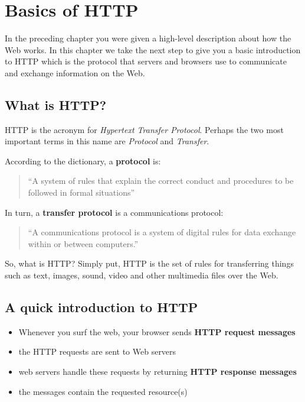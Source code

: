 \documentclass[
]{book}
\begin{document}
\hypertarget{http}{%
\chapter{Basics of HTTP}\label{http}}

In the preceding chapter you were given a high-level description about how the
Web works. In this chapter we take the next step to give you a basic introduction
to HTTP which is the protocol that servers and browsers use to communicate and
exchange information on the Web.

\hypertarget{what-is-http}{%
\section{What is HTTP?}\label{what-is-http}}

HTTP is the acronym for \emph{Hypertext Transfer Protocol}. Perhaps the two most
important terms in this name are \emph{Protocol} and \emph{Transfer}.

According to the dictionary, a \textbf{protocol} is:

\begin{quote}
``A system of rules that explain the correct conduct and procedures to be
followed in formal situations''
\end{quote}

In turn, a \textbf{transfer protocol} is a communications protocol:

\begin{quote}
``A communications protocol is a system of digital rules for data exchange
within or between computers.''
\end{quote}

So, what is HTTP? Simply put, HTTP is the set of rules for transferring things
such as text, images, sound, video and other multimedia files over the Web.

\hypertarget{a-quick-introduction-to-http}{%
\section{A quick introduction to HTTP}\label{a-quick-introduction-to-http}}

\begin{itemize}
\item
  Whenever you surf the web, your browser sends \textbf{HTTP request messages}
\item
  the HTTP requests are sent to Web servers
\item
  web servers handle these requests by returning \textbf{HTTP response messages}
\item
  the messages contain the requested resource(s)
\end{itemize}
\end{document}
